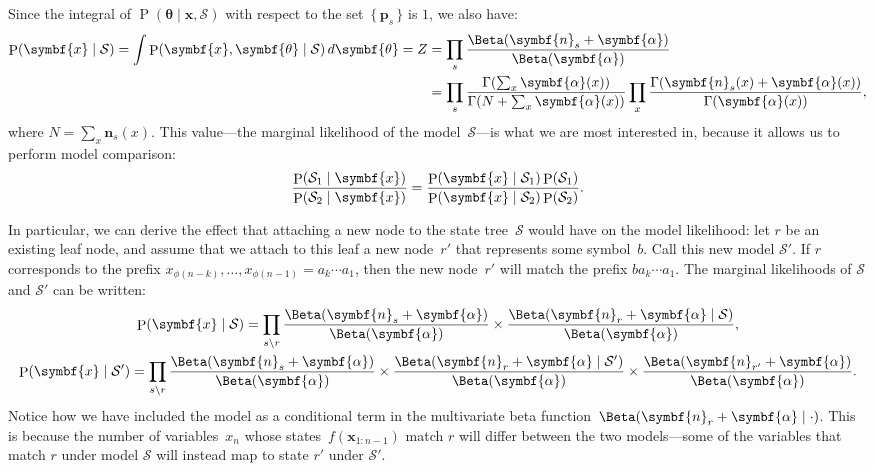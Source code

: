 \documentclass[11pt,a4paper]{article}
\newcommand\mc[1]{\mathcal{#1}}               %
\newcommand\ub[1]{\symbf{#1}}                 %
\DeclareMathOperator\Pb{P}                    %
\DeclarePairedDelimiter\lr{\lparen}{\rparen}  %
\begin{document}
Since the integral of \(\Pb(\ub{\theta} \mid \ub{x}, \mc{S})\) with respect to
the set~\(\{\,\ub{p}_s\,\}\) is \(1\), we also have:
\begin{align*}
  \Pb\lr{\ub{x} \mid \mc{S}} =
  \int \Pb\lr{\ub{x}, \ub{\theta} \mid \mc{S}}\, d\ub{\theta} = Z
  &= \prod_s \frac{\Beta\lr{\ub{n}_s + \ub{\alpha}}}{\Beta\lr{\ub{\alpha}}} \\
  &= \prod_s \frac{\Gamma\lr*{\sum_x \ub{\alpha}(x)}}
    {\Gamma\lr*{N + \sum_x \ub{\alpha}(x)}} \prod_x
    \frac{\Gamma\lr{\ub{n}_s(x) + \ub{\alpha}(x)}}{\Gamma\lr{\ub{\alpha}(x)}},
\end{align*}
where \(N = \sum_x \ub{n}_s(x)\). This value---the marginal likelihood of the
model~\(\mc{S}\)---is what we are most interested in, because it allows us to
perform model comparison:
\begin{equation}\label{eqn:model comparison}
  \frac{\Pb\lr{\mc{S}_1 \mid \ub{x}}}{\Pb\lr{\mc{S}_2 \mid \ub{x}}} =
    \frac{\Pb\lr{\ub{x} \mid \mc{S}_1} \Pb\lr{\mc{S}_1}}
    {\Pb\lr{\ub{x} \mid \mc{S}_2} \Pb\lr{\mc{S}_2}}.
\end{equation}

In particular, we can derive the effect that attaching a new node to the state
tree~\(\mc{S}\) would have on the model likelihood: let \(r\) be an existing
leaf node, and assume that we attach to this leaf a new node~\(r'\) that
represents some symbol~\(b\). Call this new model \(\mc{S}'\). If \(r\)
corresponds to the prefix \(x_{\phi(n-k)}, \dots, x_{\phi(n-1)} = a_k \dotsb
a_1\), then the new node~\(r'\) will match the prefix \(b a_k \dotsb a_1\). The
marginal likelihoods of \(\mc{S}\) and \(\mc{S}'\) can be written:
\begin{gather*}
  \Pb\lr{\ub{x} \mid \mc{S}} = \prod_{s\setminus r}
    \frac{\Beta\lr{\ub{n}_s + \ub{\alpha}}}{\Beta\lr{\ub{\alpha}}} \times
    \frac{\Beta\lr{\ub{n}_r + \ub{\alpha} \mid \mc{S}}}
    {\Beta\lr{\ub{\alpha}}}, \\
  \Pb\lr{\ub{x} \mid \mc{S}'} = \prod_{s\setminus r}
    \frac{\Beta\lr{\ub{n}_s + \ub{\alpha}}}{\Beta\lr{\ub{\alpha}}} \times
    \frac{\Beta\lr{\ub{n}_r + \ub{\alpha} \mid \mc{S}'}}{\Beta\lr{\ub{\alpha}}}
    \times \frac{\Beta\lr{\ub{n}_{r'} + \ub{\alpha}}}{\Beta\lr{\ub{\alpha}}}.
\end{gather*}
Notice how we have included the model as a conditional term in the multivariate
beta function~\(\Beta(\ub{n}_r + \ub{\alpha} \mid \cdot)\). This is because the
number of variables~\(x_n\) whose states~\(f(\ub{x}_{1:n-1})\) match \(r\) will
differ between the two models---some of the variables that match \(r\) under
model \(\mc{S}\) will instead map to state \(r'\) under \(\mc{S}'\).
\end{document}
